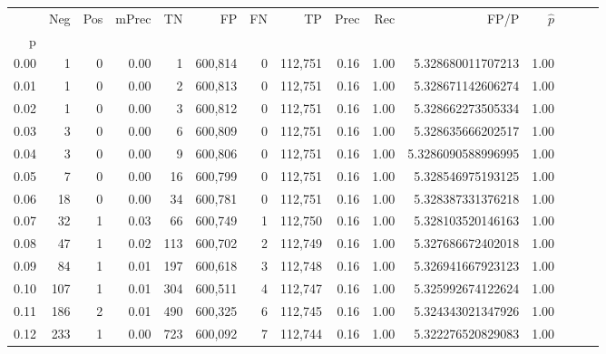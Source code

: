 \begin{tabular}{rrrrrrrrrrrrrrr}
\toprule
{} &     Neg &    Pos & mPrec &       TN &       FP &       FN &       TP &  Prec &   Rec &                    FP/P & $\hat{p}$ \\
p    &         &        &       &          &          &          &          &       &       &                         &           \\
\midrule
0.00 &       1 &      0 &  0.00 &        1 &  600,814 &        0 &  112,751 &  0.16 &  1.00 &       5.328680011707213 &      1.00 \\
0.01 &       1 &      0 &  0.00 &        2 &  600,813 &        0 &  112,751 &  0.16 &  1.00 &       5.328671142606274 &      1.00 \\
0.02 &       1 &      0 &  0.00 &        3 &  600,812 &        0 &  112,751 &  0.16 &  1.00 &       5.328662273505334 &      1.00 \\
0.03 &       3 &      0 &  0.00 &        6 &  600,809 &        0 &  112,751 &  0.16 &  1.00 &       5.328635666202517 &      1.00 \\
0.04 &       3 &      0 &  0.00 &        9 &  600,806 &        0 &  112,751 &  0.16 &  1.00 &      5.3286090588996995 &      1.00 \\
0.05 &       7 &      0 &  0.00 &       16 &  600,799 &        0 &  112,751 &  0.16 &  1.00 &       5.328546975193125 &      1.00 \\
0.06 &      18 &      0 &  0.00 &       34 &  600,781 &        0 &  112,751 &  0.16 &  1.00 &       5.328387331376218 &      1.00 \\
0.07 &      32 &      1 &  0.03 &       66 &  600,749 &        1 &  112,750 &  0.16 &  1.00 &       5.328103520146163 &      1.00 \\
0.08 &      47 &      1 &  0.02 &      113 &  600,702 &        2 &  112,749 &  0.16 &  1.00 &       5.327686672402018 &      1.00 \\
0.09 &      84 &      1 &  0.01 &      197 &  600,618 &        3 &  112,748 &  0.16 &  1.00 &       5.326941667923123 &      1.00 \\
0.10 &     107 &      1 &  0.01 &      304 &  600,511 &        4 &  112,747 &  0.16 &  1.00 &       5.325992674122624 &      1.00 \\
0.11 &     186 &      2 &  0.01 &      490 &  600,325 &        6 &  112,745 &  0.16 &  1.00 &       5.324343021347926 &      1.00 \\
0.12 &     233 &      1 &  0.00 &      723 &  600,092 &        7 &  112,744 &  0.16 &  1.00 &       5.322276520829083 &      1.00 \\

\end{tabular}
